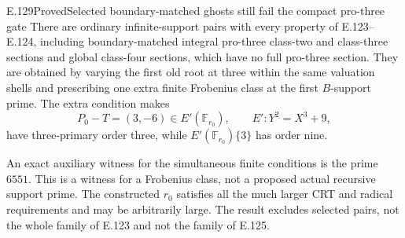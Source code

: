 \begin{result}{E.129}{Proved}{Selected boundary-matched ghosts still fail the compact pro-three gate}
There are ordinary infinite-support pairs with every property
of E.123--E.124, including boundary-matched integral pro-three
class-two and class-three sections and global class-four
sections, which have no full pro-three section.
They are obtained by varying the first old root at three
within the same valuation shells and prescribing one extra
finite Frobenius class at the first $B$-support prime.
The extra condition makes
\[
 P_0-T=(3,-6)\in E'(\mathbb F_{r_0}),
 \qquad E':Y^2=X^3+9,
\]
have three-primary order three, while
$E'(\mathbb F_{r_0})\{3\}$ has order nine.

An exact auxiliary witness for the simultaneous finite
conditions is the prime $6551$. This is a witness for a
Frobenius class, not a proposed actual recursive support
prime. The constructed $r_0$ satisfies all the much larger
CRT and radical requirements and may be arbitrarily large.
The result excludes selected pairs, not the whole family
of E.123 and not the family of E.125.
\end{result}
